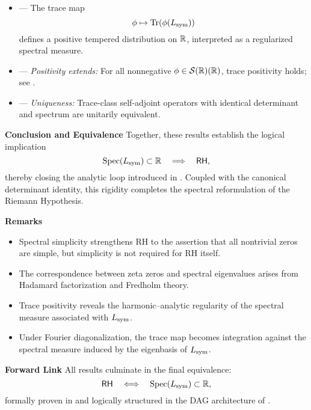 \begin{itemize}
  \item {} — The trace map
  \[
  \phi \mapsto \operatorname{Tr}(\phi(L_{\mathrm{sym}}))
  \]
  defines a positive tempered distribution on \( \mathbb{R} \), interpreted as a regularized spectral measure.

  \item {} — \textit{Positivity extends:} For all nonnegative \( \phi \in \mathcal{S}(\mathbb{R})(\mathbb{R}) \), trace positivity holds; see .

  \item {} — \textit{Uniqueness:} Trace-class self-adjoint operators with identical determinant and spectrum are unitarily equivalent.
\end{itemize}

\medskip

\textbf{Conclusion and Equivalence}
Together, these results establish the logical implication
\[
\operatorname{Spec}(L_{\mathrm{sym}}) \subset \mathbb{R} \quad \Longrightarrow \quad \mathsf{RH},
\]
thereby closing the analytic loop introduced in . Coupled with the canonical determinant identity, this rigidity completes the spectral reformulation of the Riemann Hypothesis.

\medskip

\textbf{Remarks}
\begin{itemize}
  \item Spectral simplicity strengthens RH to the assertion that all nontrivial zeros are simple, but simplicity is not required for RH itself.
  \item The correspondence between zeta zeros and spectral eigenvalues arises from Hadamard factorization and Fredholm theory.
  \item Trace positivity reveals the harmonic–analytic regularity of the spectral measure associated with \( L_{\mathrm{sym}} \).
  \item Under Fourier diagonalization, the trace map becomes integration against the spectral measure induced by the eigenbasis of \( L_{\mathrm{sym}} \).
\end{itemize}

\medskip

\textbf{Forward Link}
All results culminate in the final equivalence:
\[
\mathsf{RH} \quad \Longleftrightarrow \quad \operatorname{Spec}(L_{\mathrm{sym}}) \subset \mathbb{R},
\]
formally proven in  and logically structured in the DAG architecture of .
